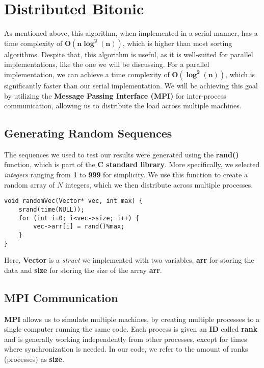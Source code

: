 \documentclass[12pt]{report}
\begin{document}
\chapter{Distributed Bitonic}
As mentioned above, this algorithm, when implemented in a serial manner, has a time complexity of \(\boldsymbol{O(n\log^2(n))}\), which is higher than most sorting algorithms. Despite that, this algorithm is useful, as it is well-suited for parallel implementations, like the one we will be discussing. For a parallel implementation, we can achieve a time complexity of \(\boldsymbol{O(\log^2(n))}\), which is significantly faster than our serial implementation. We will be achieving this goal by utilizing the \textbf{Message Passing Interface (MPI)} for inter-process communication, allowing us to distribute the load across multiple machines.

\section{Generating Random Sequences}
The sequences we used to test our results were generated using the \textbf{rand()} function, which is part of the \textbf{C standard library}. More specifically, we selected \textit{integers} ranging from \textbf{1} to \textbf{999} for simplicity.  We use this function to create a random array of $N$ integers, which we then distribute across multiple processes.

\begin{lstlisting}[style=cstyle]
void randomVec(Vector* vec, int max) {
    srand(time(NULL));
    for (int i=0; i<vec->size; i++) {
        vec->arr[i] = rand()%max;
    }
}
\end{lstlisting}

Here, \textbf{Vector} is a \textit{struct} we implemented with two variables, \textbf{arr} for storing the data and \textbf{size} for storing the size of the array \textbf{arr}. \newpage

\section{MPI Communication}
\textbf{MPI}  allows us to simulate multiple machines, by creating multiple processes to a single computer running the same code. Each process is given an \textbf{ID} called \textbf{rank} and is generally working independently from other processes, except for times where synchronization is needed. In our code, we refer to the amount of ranks (processes) as \textbf{size}.
\end{document}
